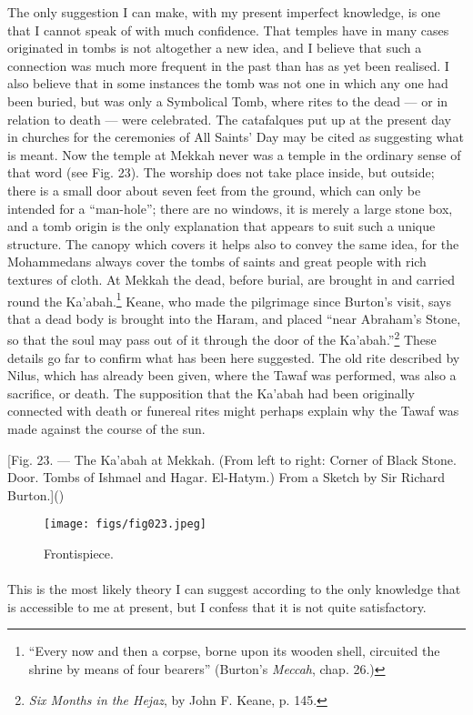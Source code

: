 \documentclass[a4paper, 11pt, oneside, polutonikogreek, english]{article}
\begin{document}
The only suggestion I can make, with my present imperfect knowledge, is one that I cannot speak of with much confidence. That temples have in many cases originated in tombs is not altogether a new idea, and I believe that such a connection was much more frequent in the past than has as yet been realised. I also believe that in some instances the tomb was not one in which any one had been buried, but was only a Symbolical Tomb, where rites to the dead --- or in relation to death --- were celebrated. The catafalques put up at the present day in churches for the ceremonies of All Saints' Day may be cited as suggesting what is meant. Now the temple at Mekkah never was a temple in the ordinary sense of that word (see Fig. 23). The worship does not take place inside, but outside; there is a small door about seven feet from the ground, which can only be intended for a ``man-hole''; there are no windows, it is merely a large stone box, and a tomb origin is the only explanation that appears to suit such a unique structure. The canopy which covers it helps also to convey the same idea, for the Mohammedans always cover the tombs of saints and great people with rich textures of cloth. At Mekkah the dead, before burial, are brought in and carried round the Ka'abah.\footnote{``Every now and then a corpse, borne upon its wooden shell, circuited the shrine by means of four bearers'' (Burton's \emph{Meccah}, chap. 26.)} Keane, who made the pilgrimage since Burton's visit, says that a dead body is brought into the Haram, and placed ``near Abraham's Stone, so that the soul may pass out of it through the door of the Ka'abah.''\footnote{\emph{Six Months in the Hejaz}, by John F. Keane, p. 145.} These details go far to confirm what has been here suggested. The old rite described by Nilus, which has already been given, where the Tawaf was performed, was also a sacrifice, or death. The supposition that the Ka'abah had been originally connected with death or funereal rites might perhaps explain why the Tawaf was made against the course of the sun.

[Fig. 23. --- The Ka'abah at Mekkah. (From left to right: Corner of Black Stone. Door. Tombs of Ishmael and Hagar. El-Hatym.) From a Sketch by Sir Richard Burton.]()
\begin{figure}[H]
\centering
\texttt{[image: figs/fig023.jpeg]}
\caption{Frontispiece.}
\end{figure}
\paragraph{}
This is the most likely theory I can suggest according to the only knowledge that is accessible to me at present, but I confess that it is not quite satisfactory.
\end{document}
